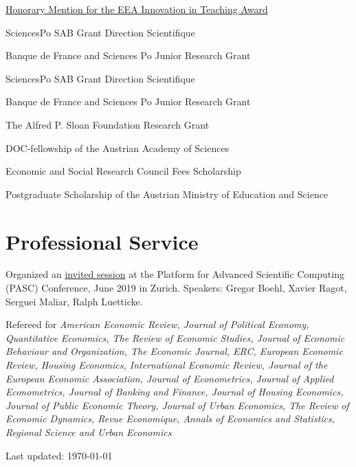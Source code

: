 \documentclass[letterpaper]{article}
\renewenvironment{itemize}{
  \begin{list}{}{
    \setlength{\leftmargin}{1.5em}
  }
}{
  \end{list}
}
\begin{document}
\begin{itemize}
\item[2022:] \href{https://www.eeassoc.org/eea-award-innovation-teaching-2022}{Honorary Mention for the EEA Innovation in Teaching Award}
\item[2022--2024:] SciencesPo SAB Grant Direction Scientifique
\item[2020:] Banque de France and Sciences Po Junior Research Grant
\item[2018:] SciencesPo SAB Grant Direction Scientifique
\item[2016:] Banque de France and Sciences Po Junior Research Grant
\item[2012--2014:] The Alfred P. Sloan Foundation Research Grant
\item[2010--2012:] DOC-fellowship of the Austrian Academy of Sciences
\item[2009--2012:] Economic and Social Research Council Fees Scholarship
\item[2007--2008:] Postgraduate Scholarship of the Austrian Ministry of Education and Science
\end{itemize}

\section*{Professional Service}

\begin{itemize}
\item Organized an \href{https://pasc19.pasc-conference.org/program/schedule/session/?sess=sess124}{invited session} at the Platform for Advanced Scientific Computing (PASC) Conference, June 2019 in Zurich. Speakers: Gregor Boehl, Xavier Ragot, Serguei Maliar, Ralph Luetticke.
\item Refereed for {\it American Economic Review, Journal of Political Economy, Quantitative Economics, The Review of Economic Studies, Journal of Economic Behaviour and Organization, The Economic Journal, ERC, European Economic Review, Housing Economics, International Economic Review, Journal of the European Economic Association, Journal of Econometrics, Journal of Applied Econometrics, Journal of Banking and Finance, Journal of Housing Economics, Journal of Public Economic Theory, Journal of Urban Economics, The Review of Economic Dynamics, Revue Economique, Annals of Economics and Statistics, Regional Science and Urban Economics}
\end{itemize}

\bigskip

\begin{center}
  \begin{footnotesize}
    Last updated: \today \\
  \end{footnotesize}
\end{center}
\end{document}
